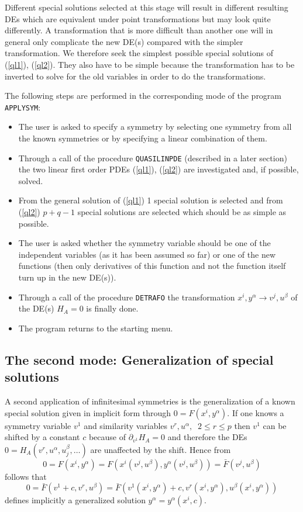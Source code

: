 Different special solutions selected at this stage
will result in different
resulting DEs which are equivalent under point transformations but may
look quite differently. A transformation that is more difficult than another
one will in general
only complicate the new DE(s) compared with the simpler transformation.
We therefore seek the simplest possible special
solutions of (\ref{ql1}), (\ref{ql2}). They also
have to be simple because the transformation has to be inverted to solve for
the old variables in order to do the transformations.

The following steps are performed in the corresponding mode of the
program {\tt APPLYSYM}:
\begin{itemize}
\item The user is asked to specify a symmetry by selecting one symmetry
from all the known symmetries or by specifying a linear combination of them.
\item Through a call of the procedure {\tt QUASILINPDE} (described in a later
section) the two linear first order PDEs (\ref{ql1}), (\ref{ql2}) are
investigated and, if possible, solved.
\item From the general solution of (\ref{ql1}) 1 special solution
is selected and from (\ref{ql2}) $p+q-1$ special
solutions are selected which should be as simple as possible.
\item The user is asked whether the symmetry variable should be one of the
independent variables (as it has been assumed so far) or one of the new
functions (then only derivatives of this function and not the function itself
turn up in the new DE(s)).
\item Through a call of the procedure {\tt DETRAFO} the transformation
$x^i,y^\alpha \rightarrow v^j,u^\beta$ of the DE(s) $H_A=0$ is finally done.
\item The program returns to the starting menu.
\end{itemize}
\subsection{The second mode: Generalization of special solutions}
A second application of infinitesimal symmetries is the generalization
of a known special solution given in implicit form through
$0 = F(x^i,y^\alpha)$. If one knows a symmetry variable $v^1$ and
similarity variables $v^r, u^\alpha,\;\;2\leq r\leq p$ then
$v^1$ can be shifted by a constant $c$ because of
$\partial_{v^1}H_A = 0$ and
therefore the DEs $0 = H_A(v^r,u^\alpha,u^\beta_j,\ldots)$
are unaffected by the shift. Hence from
\[0 = F(x^i, y^\alpha) = F(x^i(v^j,u^\beta), y^\alpha(v^j,u^\beta)) =
\bar{F}(v^j,u^\beta)\] follows that
\[ 0 = \bar{F}(v^1+c,v^r,u^\beta) =
\bar{F}(v^1(x^i,y^\alpha)+c, v^r(x^i,y^\alpha), u^\beta(x^i,y^\alpha))\]
defines implicitly a generalized solution $y^\alpha=y^\alpha(x^i,c)$.


